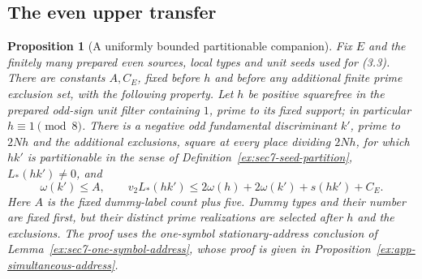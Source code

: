 \documentclass[11pt]{article}
\newtheorem{proposition}[theorem]{Proposition}
\theoremstyle{definition}
\theoremstyle{remark}
\begin{document}
\subsection{The even upper transfer}
\begin{proposition}[A uniformly bounded partitionable companion]\label{ex:app-rough-companion}
Fix $E$ and the finitely many prepared even sources, local types and
unit seeds used for (3.3). There are constants $A,C_E$, fixed before
$h$ and before any additional finite prime exclusion set, with the
following property. Let $h$ be positive squarefree in the prepared
odd-sign unit filter containing $1$, prime to its fixed support; in
particular $h\equiv1\pmod8$. There is a negative odd fundamental
discriminant $k'$, prime to $2Nh$ and the additional exclusions,
square at every place dividing $2Nh$, for which $hk'$ is partitionable
in the sense of Definition~\ref{ex:sec7-seed-partition},
$L_*(hk')\ne0$, and
\[
 \omega(k')\le A,\qquad
 v_2L_*(hk')\le2\omega(h)+2\omega(k')+s(hk')+C_E.
\]
Here $A$ is the fixed dummy-label count plus five. Dummy types and
their number are fixed first, but their distinct prime realizations
are selected after $h$ and the exclusions. The proof uses the
one-symbol stationary-address conclusion of
Lemma~\ref{ex:sec7-one-symbol-address}, whose proof is given in
Proposition~\ref{ex:app-simultaneous-address}.
\end{proposition}
\end{document}
